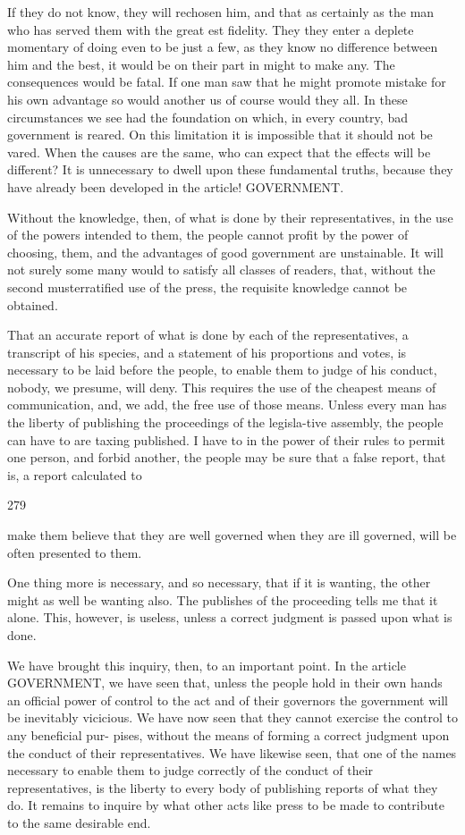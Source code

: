 \documentclass{article}
\begin{document}
If they do not know, they will rechosen him, and that as certainly as the man who has served them with the great est fidelity. They they enter a deplete momentary of doing even to be just a few, as they know no difference between him and the best, it would be on their part in might to make any. The consequences would be fatal. If one man saw that he might promote mistake for his own advantage so would another us of course would they all. In these circumstances we see had the foundation on which, in every country, bad government is reared. On this limitation it is impossible that it should not be vared. When the causes are the same, who can expect that the effects will be different? It is unnecessary to dwell upon these fundamental truths, because they have already been developed in the article! GOVERNMENT.

Without the knowledge, then, of what is done by their representatives, in the use of the powers intended to them, the people cannot profit by the power of choosing, them, and the advantages of good government are unstainable. It will not surely some many would to satisfy all classes of readers, that, without the second musterratified use of the press, the requisite knowledge cannot be obtained.

That an accurate report of what is done by each of the representatives, a transcript of his species, and a statement of his proportions and votes, is necessary to be laid before the people, to enable them to judge of his conduct, nobody, we presume, will deny. This requires the use of the cheapest means of communication, and, we add, the free use of those means. Unless every man has the liberty of publishing the proceedings of the legisla-tive assembly, the people can have to are taxing published. I have to in the power of their rules to permit one person, and forbid another, the people may be sure that a false report, that is, a report calculated to

279

make them believe that they are well governed when they are ill governed, will be often presented to them.

One thing more is necessary, and so necessary, that if it is wanting, the other might as well be wanting also. The publishes of the proceeding tells me that it alone. This, however, is useless, unless a correct judgment is passed upon what is done.

We have brought this inquiry, then, to an important point. In the article GOVERNMENT, we have seen that, unless the people hold in their own hands an official power of control to the act and of their governors the government will be inevitably vicicious. We have now seen that they cannot exercise the control to any beneficial pur- pises, without the means of forming a correct judgment upon the conduct of their representatives. We have likewise seen, that one of the names necessary to enable them to judge correctly of the conduct of their representatives, is the liberty to every body of publishing reports of what they do. It remains to inquire by what other acts like press to be made to contribute to the same desirable end.
\end{document}
